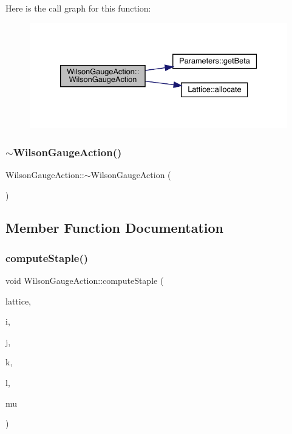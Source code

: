 Here is the call graph for this function\+:\nopagebreak
\begin{figure}[H]
\begin{center}
\leavevmode
\includegraphics[width=333pt]{class_wilson_gauge_action_a50d06446cf93f7e738e88c372920f518_cgraph}
\end{center}
\end{figure}
\mbox{\label{class_wilson_gauge_action_a0995cd407b76b4f5d035659718591c11}} 
\subsubsection{\texorpdfstring{$\sim$WilsonGaugeAction()}{~WilsonGaugeAction()}}
{\footnotesize\ttfamily Wilson\+Gauge\+Action\+::$\sim$\+Wilson\+Gauge\+Action (\begin{DoxyParamCaption}{ }\end{DoxyParamCaption})}



\subsection{Member Function Documentation}
\mbox{\label{class_wilson_gauge_action_af1f6ba42fcc2b923dc3b37bf150bfae9}} 
\subsubsection{\texorpdfstring{computeStaple()}{computeStaple()}}
{\footnotesize\ttfamily void Wilson\+Gauge\+Action\+::compute\+Staple (\begin{DoxyParamCaption}\item[{\mbox{\hyperlink{class_lattice}{Lattice}}$<$ \mbox{\hyperlink{class_s_u3}{S\+U3}} $>$ $\ast$}]{lattice,  }\item[{unsigned int}]{i,  }\item[{unsigned int}]{j,  }\item[{unsigned int}]{k,  }\item[{unsigned int}]{l,  }\item[{int}]{mu }\end{DoxyParamCaption})\hspace{0.3cm}{\ttfamily [virtual]}}



